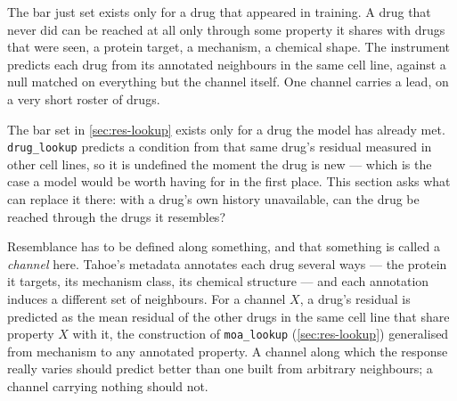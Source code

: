 \clearpage

\begin{question}[8]
The bar just set exists only for a drug that appeared in training. A drug that
never did can be reached at all only through some property it shares with drugs
that were seen, a protein target, a mechanism, a chemical shape. The instrument
predicts each drug from its annotated neighbours in the same cell line, against a
null matched on everything but the channel itself. One channel carries a lead, on
a very short roster of drugs.
\end{question}

\noindent
The bar set in \cref{sec:res-lookup} exists only for a drug the model has already
met. \texttt{drug\_lookup} predicts a condition from that same drug's residual
measured in other cell lines, so it is undefined the moment the drug is new ---
which is the case a model would be worth having for in the first place. This
section asks what can replace it there: with a drug's own history unavailable, can
the drug be reached through the drugs it resembles?

Resemblance has to be defined along something, and that something is called a
\emph{channel} here. Tahoe's metadata annotates each drug several ways --- the
protein it targets, its mechanism class, its chemical structure --- and each
annotation induces a different set of neighbours. For a channel $X$, a drug's
residual is predicted as the mean residual of the other drugs in the same cell
line that share property $X$ with it, the construction of \texttt{moa\_lookup}
(\cref{sec:res-lookup}) generalised from mechanism to any annotated property. A
channel along which the response really varies should predict better than one
built from arbitrary neighbours; a channel carrying nothing should not.

